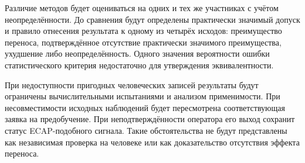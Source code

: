 Различие методов будет оцениваться на одних и тех же участниках с учётом неопределённости. До сравнения будут определены практически значимый допуск и правило отнесения результата к одному из четырёх исходов: преимущество переноса, подтверждённое отсутствие практически значимого преимущества, ухудшение либо неопределённость. Одного значения вероятности ошибки статистического критерия недостаточно для утверждения эквивалентности.

При недоступности пригодных человеческих записей результаты будут ограничены вычислительными испытаниями и анализом применимости. При несовместимости исходных наблюдений будет пересмотрена соответствующая заявка на предобучение. При неподтверждённости оператора его выход сохранит статус ECAP-подобного сигнала. Такие обстоятельства не будут представлены как независимая проверка на человеке или как доказательство отсутствия эффекта переноса.
